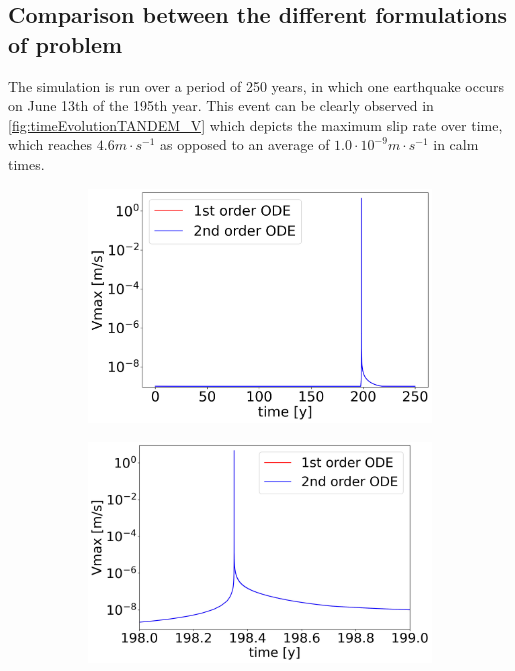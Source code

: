 \subsection{Comparison between the different formulations of problem}
The simulation is run over a period of 250 years, in which one earthquake occurs on June 13th of the 195th year. This event can be clearly observed in \autoref{fig:timeEvolutionTANDEM_V} which depicts the maximum slip rate over time, which reaches $4.6m\cdot s^{-1}$ as opposed to an average of $1.0 \cdot 10^{-9}m\cdot s^{-1}$ in calm times. 
\begin{figure}[H]
    \centering
    \begin{subfigure}{0.32\textwidth}
     	\centering
    	\includegraphics[width=1\textwidth]{images/TANDEMcompareFormulationstimeEvolutionVall.png}
    \end{subfigure} 
    \begin{subfigure}{0.32\textwidth}
    	\centering
    	\includegraphics[width=1\textwidth]{images/TANDEMcompareFormulationstimeEvolutionVsurroundings.png}

\end{subfigure}
\end{figure}
